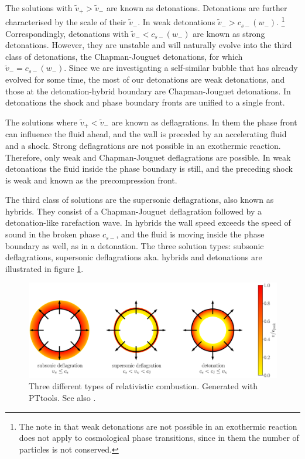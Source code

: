 The solutions with $\tilde{v}_+ > \tilde{v}_-$ are known as detonations.
Detonations are further characterised by the scale of their $\tilde{v}_-$.
In weak detonations $\tilde{v}_- > c_{s-}(w_-)$.%
\footnote{The note in \cite[p. 265]{rezzolla_relativistic_2013} that weak detonations are not possible in an exothermic reaction does not apply to cosmological phase transitions, since in them the number of particles is not conserved.}
Correspondingly, detonations with $\tilde{v}_- < c_{s-}(w_-)$ are known as strong detonations.
However, they are unstable and will naturally evolve into the third class of detonations,
the Chapman-Jouguet detonations, for which $\tilde{v}_- = c_{s-}(w_-)$.
\cite[p. 279]{rezzolla_relativistic_2013}
Since we are investigating a self-similar bubble that has already evolved for some time,
the most of our detonations are weak detonations,
and those at the detonation-hybrid boundary are Chapman-Jouguet detonations.
In detonations the shock and phase boundary fronts are unified to a single front.
\cite{kurki-suonio_supersonic_1995}

The solutions where $\tilde{v}_+ < \tilde{v}_-$ are known as deflagrations.
In them the phase front can influence the fluid ahead, and the wall is preceded by an accelerating fluid and a shock.
Strong deflagrations are not possible in an exothermic reaction.
\cite[p. 267]{rezzolla_relativistic_2013}
Therefore, only weak and Chapman-Jouguet deflagrations are possible.
In weak detonations the fluid inside the phase boundary is still, and the preceding shock is weak and
known as the precompression front.
\cite{rezzolla_relativistic_2013}

The third class of solutions are the supersonic deflagrations, also known as hybrids.
They consist of a Chapman-Jouguet deflagration followed by a detonation-like rarefaction wave.
In hybrids the wall speed exceeds the speed of sound in the broken phase $c_{s-}$,
and the fluid is moving inside the phase boundary as well, as in a detonation.
\cites{kurki-suonio_supersonic_1995}[p. 37]{lecture_notes}[p. 35]{hindmarsh_gw_pt_2019}
The three solution types: subsonic deflagrations, supersonic deflagrations aka. hybrids and detonations are illustrated in figure \ref{fig:solution_types}.

\begin{figure}[ht!]
\centering
\includegraphics[width=\textwidth]{msc2-python/fig/relativistic_combustion.eps}
\caption{Three different types of relativistic combustion. Generated with PTtools. See also \cites[fig. 14]{lecture_notes}[fig. 14]{mazumdar_review_2019}.}
\label{fig:solution_types}
\end{figure}


